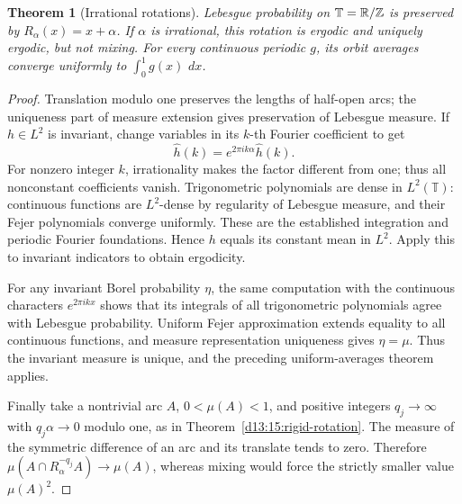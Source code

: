 \documentclass[11pt,oneside]{book}
\newtheorem{theorem}{Theorem}[chapter]
\theoremstyle{definition}
\theoremstyle{remark}\newtheorem{remark}[theorem]{Remark}
\newcommand{\R}{\mathbb R}\newcommand{\C}{\mathbb C}
\newcommand{\dd}{\,d}\newcommand{\id}{\operatorname{id}}
\begin{document}
\begin{theorem}[Irrational rotations]\label{d13:19:rotation-ergodicity}
Lebesgue probability on \(\mathbb T=\R/\Z\) is preserved by
\(R_\alpha(x)=x+\alpha\). If \(\alpha\) is irrational, this rotation
is ergodic and uniquely ergodic, but not mixing.
For every continuous periodic \(g\), its orbit averages converge
uniformly to \(\int_0^1g(x)\,\dd x\).
\end{theorem}
\begin{proof}
Translation modulo one preserves the lengths of half-open arcs;
the uniqueness part of measure extension gives preservation of
Lebesgue measure. If \(h\in L^2\) is invariant, change variables
in its \(k\)-th Fourier coefficient to get
\[
 \widehat h(k)=e^{2\pi i k\alpha}\widehat h(k).
\]
For nonzero integer \(k\), irrationality makes the factor different
from one; thus all nonconstant coefficients vanish.
Trigonometric polynomials are dense in \(L^2(\mathbb T)\):
continuous functions are \(L^2\)-dense by regularity of Lebesgue
measure, and their Fejer polynomials converge uniformly.
These are the established integration and periodic Fourier
foundations. Hence \(h\) equals its constant mean in \(L^2\).
Apply this to invariant indicators to obtain ergodicity.

For any invariant Borel probability \(\eta\), the same computation
with the continuous characters \(e^{2\pi ikx}\) shows that its
integrals of all trigonometric polynomials agree with Lebesgue
probability. Uniform Fejer approximation extends equality to all
continuous functions, and measure representation uniqueness gives
\(\eta=\mu\). Thus the invariant measure is unique, and the
preceding uniform-averages theorem applies.

Finally take a nontrivial arc \(A\), \(0<\mu(A)<1\), and positive
integers \(q_j\to\infty\) with \(q_j\alpha\to0\) modulo one, as in
Theorem~\ref{d13:15:rigid-rotation}. The measure of the symmetric
difference of an arc and its translate tends to zero. Therefore
\(\mu(A\cap R_\alpha^{-q_j}A)\to\mu(A)\), whereas mixing would
force the strictly smaller value \(\mu(A)^2\).
\end{proof}
\end{document}
